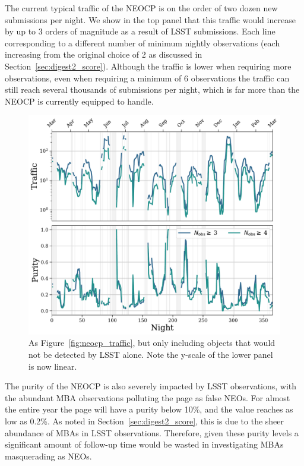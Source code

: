 \documentclass[twocolumn]{aastex631}
\begin{document}
The current typical traffic of the NEOCP is on the order of two dozen new submissions per night. We show in the top panel that this traffic would increase by up to 3 orders of magnitude as a result of LSST submissions. Each line corresponding to a different number of minimum nightly observations (each increasing from the original choice of 2 as discussed in Section~\ref{sec:digest2_score}). Although the traffic is lower when requiring more observations, even when requiring a minimum of 6 observations the traffic can still reach several thousands of submissions per night, which is far more than the NEOCP is currently equipped to handle.

\begin{figure}
    \centering
    \includegraphics[width=\textwidth]{traffic_purity_unfindable.pdf}
    \caption{As Figure~\ref{fig:neocp_traffic}, but only including objects that would not be detected by LSST alone. Note the y-scale of the lower panel is now linear.}
    \label{fig:neocp_traffic_unfindable}
\end{figure}

The purity of the NEOCP is also severely impacted by LSST observations, with the abundant MBA observations polluting the page as false NEOs. For almost the entire year the page will have a purity below 10\%, and the value reaches as low as 0.2\%. As noted in Section~\ref{sec:digest2_score}, this is due to the sheer abundance of MBAs in LSST observations. Therefore, given these purity levels a significant amount of follow-up time would be wasted in investigating MBAs masquerading as NEOs.
\end{document}
